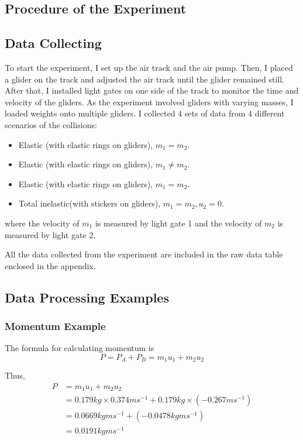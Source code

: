 \documentclass[12pt,a4paper]{article}
\begin{document}
\begin{spacing}{1.25}
\section{Procedure of the Experiment}
\subsection{Data Collecting}
To start the experiment, I set up the air track and the air pump. Then, I placed a glider on the track and adjusted the air track until the glider remained still. After that, I installed light gates on one side of the track to monitor the time and velocity of the gliders. As the experiment involved gliders with varying masses, I loaded weights onto multiple gliders.
I collected 4 sets of data from 4 different scenarios of the collisions:
\begin{itemize}
    \setlength{\itemsep}{-1ex}
    \setlength{\parsep}{-1ex}
    \setlength{\topsep}{-1em}
    \item Elastic (with elastic rings on gliders), $ m_{1} = m_2 $.
    \item Elastic (with elastic rings on gliders), $ m_1 \neq m_2 $.
    \item Elastic (with elastic rings on gliders), $ m_1 = m_2 $.
    \item Total inelastic(with stickers on gliders), $ m_1 = m_2, u_2 = 0 $.
\end{itemize}
where the velocity of $ m_1 $ is measured by light gate 1 and the velocity of $ m_{2} $ is measured by light gate 2.\par
All the data collected from the experiment are included in the raw data table enclosed in the appendix.
\subsection{Data Processing Examples}
\subsubsection{Momentum Example}
The formula for calculating momentum is \[
    P = P_A + P_B = m_1u_1 + m_2u_2
\]\par
Thus, 
\[
\begin{aligned}
    P & = m_1u_1 + m_2u_{2} \\
    & = 0.179kg \times 0.374ms^{-1} + 0.179kg \times (-0.267 ms^{-1}) \\
    & = 0.0669kgms^{-1} + ( -0.0478kgms^{-1}) \\ 
    & = 0.0191kgms^{-1} \\
\end{aligned}
\]

\end{spacing}
\end{document}
